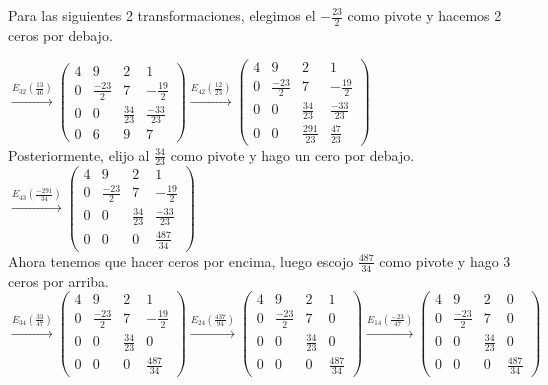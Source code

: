 \documentclass[11pt, a4paper]{article}
\newif\IfInSansMode
\theoremstyle{theorem-style}
\theoremstyle{definition-style}
\theoremstyle{remark-style}
\theoremstyle{example-style}
\begin{document}
Para las siguientes 2 transformaciones, elegimos el $-\frac{23}{2}$ como pivote y hacemos 2 ceros por debajo.

$\xrightarrow{E_{32}(\frac{13}{46})}
\begin{pmatrix}
4 & 9 & 2 & 1 \\
0 & \frac{-23}{2} & 7 & -\frac{19}{2} \\
0 & 0 & \frac{34}{23} & \frac{-33}{23} \\
0 & 6 & 9 & 7
\end{pmatrix}
\xrightarrow{E_{42}(\frac{12}{23})}
\begin{pmatrix}
4 & 9 & 2 & 1 \\
0 & \frac{-23}{2} & 7 & -\frac{19}{2} \\
0 & 0 & \frac{34}{23} & \frac{-33}{23} \\
0 & 0 & \frac{291}{23} & \frac{47}{23}
\end{pmatrix}$ \\
Posteriormente, elijo al $\frac{34}{23}$ como pivote y hago un cero por debajo. \\
$
\xrightarrow{E_{43}(\frac{-291}{34})}
\begin{pmatrix}
4 & 9 & 2 & 1 \\
0 & \frac{-23}{2} & 7 & -\frac{19}{2} \\
0 & 0 & \frac{34}{23} & \frac{-33}{23} \\
0 & 0 & 0 & \frac{487}{34}
\end{pmatrix}$ \\

Ahora tenemos que hacer ceros por encima, luego escojo $\frac{487}{34}$ como pivote y hago 3 ceros por arriba. \\

$
\xrightarrow{E_{34}(\frac{33}{47})}
\begin{pmatrix}
4 & 9 & 2 & 1 \\
0 & \frac{-23}{2} & 7 & -\frac{19}{2} \\
0 & 0 & \frac{34}{23} & 0 \\
0 & 0 & 0 & \frac{487}{34}
\end{pmatrix}
\xrightarrow{E_{24}(\frac{437}{94})}
\begin{pmatrix}
4 & 9 & 2 & 1 \\
0 & \frac{-23}{2} & 7 & 0 \\
0 & 0 & \frac{34}{23} & 0 \\
0 & 0 & 0 & \frac{487}{34}
\end{pmatrix}
\xrightarrow{E_{14}(\frac{-23}{47})}
\begin{pmatrix}
4 & 9 & 2 & 0 \\
0 & \frac{-23}{2} & 7 & 0 \\
0 & 0 & \frac{34}{23} & 0 \\
0 & 0 & 0 & \frac{487}{34}
\end{pmatrix}$ \\
\end{document}
